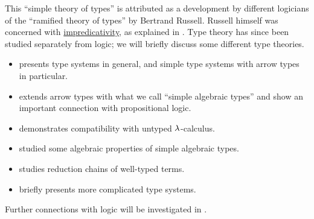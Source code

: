 This \enquote{simple theory of types} is attributed as a development by different logicians of the \enquote{ramified theory of types} by Bertrand Russell. Russell himself was concerned with \hyperref[con:impredicative_definition]{impredicativity}, as explained in . Type theory has since been studied separately from logic; we will briefly discuss some different type theories.

\begin{itemize}
  \item {} presents type systems in general, and simple type systems with arrow types in particular.
  \item {} extends arrow types with what we call \enquote{simple algebraic types} and show an important connection with propositional logic.
  \item {} demonstrates compatibility with untyped \( {\mathrm \lambda} \)-calculus.
  \item {} studied some algebraic properties of simple algebraic types.
  \item {} studies reduction chains of well-typed terms.
  \item {} briefly presents more complicated type systems.
\end{itemize}

Further connections with logic will be investigated in .
